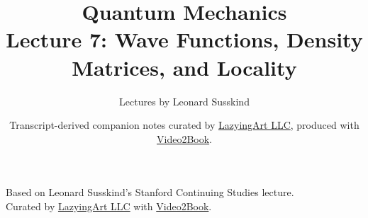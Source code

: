 \documentclass[11pt,oneside]{book}
\begin{document}
\frontmatter
\title{Quantum Mechanics\\Lecture 7: Wave Functions, Density Matrices, and Locality}
\author{Lectures by Leonard Susskind}
\date{Transcript-derived companion notes curated by \href{https://lazying.art}{LazyingArt LLC}, produced with \href{https://github.com/lachlanchen/Video2Book}{Video2Book}.}
\maketitle
\begin{center}
\small Based on Leonard Susskind's Stanford Continuing Studies lecture.\\
Curated by \href{https://lazying.art}{LazyingArt LLC} with \href{https://github.com/lachlanchen/Video2Book}{Video2Book}.
\end{center}
\clearpage
\mainmatter

\end{document}
